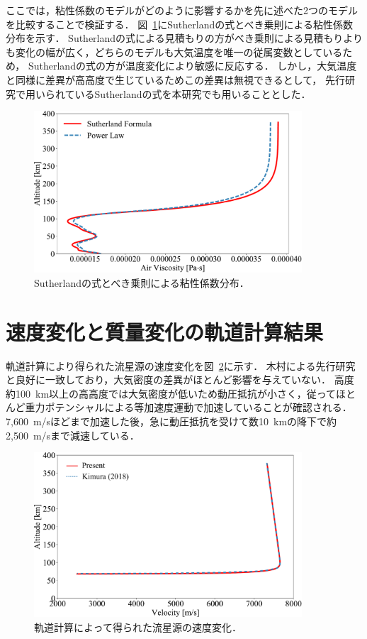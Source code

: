 ここでは，粘性係数のモデルがどのように影響するかを先に述べた2つのモデルを比較することで検証する．
図~\ref{fig:trajectory-viscosity}にSutherlandの式とべき乗則による粘性係数分布を示す．
Sutherlandの式による見積もりの方がべき乗則による見積もりよりも変化の幅が広く，どちらのモデルも大気温度を唯一の従属変数としているため，
Sutherlandの式の方が温度変化により敏感に反応する．
しかし，大気温度と同様に差異が高高度で生じているためこの差異は無視できるとして，
先行研究で用いられているSutherlandの式を本研究でも用いることとした．
\begin{figure}[p]
    \centering
    \includegraphics[width=10cm]{fig/trajectory/viscosity.pdf}
    \caption{Sutherlandの式とべき乗則による粘性係数分布．}
    \label{fig:trajectory-viscosity}
\end{figure}

\section{速度変化と質量変化の軌道計算結果}
軌道計算により得られた流星源の速度変化を図~\ref{fig:trajectory-velo}に示す．
木村による先行研究と良好に一致しており，大気密度の差異がほとんど影響を与えていない．
高度約100~km以上の高高度では大気密度が低いため動圧抵抗が小さく，従ってほとんど重力ポテンシャルによる等加速度運動で加速していることが確認される．
7,600~m/sほどまで加速した後，急に動圧抵抗を受けて数10~kmの降下で約2,500~m/sまで減速している．

\begin{figure}[p]
    \centering
    \includegraphics[width=10cm]{fig/trajectory/velo.pdf}
    \caption{軌道計算によって得られた流星源の速度変化．}
    \label{fig:trajectory-velo}
\end{figure}

